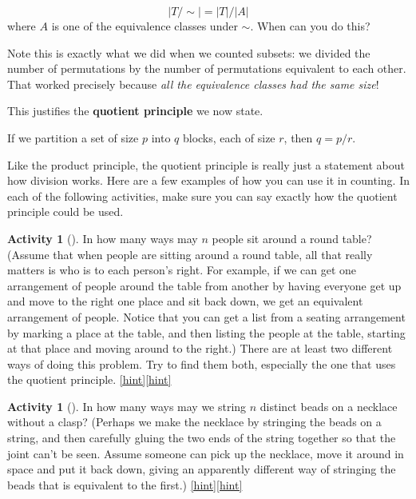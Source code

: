 \documentclass[10pt,]{book}
\newcommand{\terminology}[1]{\textbf{#1}}
\theoremstyle{plain}
\theoremstyle{definition}
\theoremstyle{definition}
\theoremstyle{definition}
\newtheorem{activity}[project]{Activity}
\numberwithin{equation}{chapter}
\begin{document}
\begin{equation*}
|T/\sim| = |T|/|A|
\end{equation*}
where \(A\) is one of the equivalence classes under \(\sim\).  When can you do this?%
\par
\hypertarget{p-758}{}%
Note this is exactly what we did when we counted subsets: we divided the number of permutations by the number of permutations equivalent to each other.  That worked precisely because \emph{all the equivalence classes had the same size}!%
\par
\hypertarget{p-759}{}%
This justifies the \terminology{quotient principle} we now state.%
\begin{assemblage}\label{assemblage-quotientprinciple}
\hypertarget{p-760}{}%
If we partition a set of size \(p\) into \(q\) blocks, each of size \(r\), then \(q = p/r\).%
\end{assemblage}
\hypertarget{p-761}{}%
Like the product principle, the quotient principle is really just a statement about how division works.  Here are a few examples of how you can use it in counting.  In each of the following activities, make sure you can say exactly how the quotient principle could be used.%
\begin{activity}[]\label{roundtable}
\hypertarget{p-762}{}%
In how many ways may \(n\) people sit around a round table? (Assume that when people are sitting around a round table, all that really matters is who is to each person's right. For example, if we can get one arrangement of people around the table from another by having everyone get up and move to the right one place and sit back down, we get an equivalent arrangement of people. Notice that you can get a list from a seating arrangement by marking a place at the table, and then listing the people at the table, starting at that place and moving around to the right.) There are at least two different ways of doing this problem. Try to find them both, especially the one that uses the quotient principle.%
\hfill{\tiny\hyperlink{a-110}{[hint]}\hypertarget{q-110}{}}\hfill{\tiny\hyperlink{a-110}{[hint]}\hypertarget{q-110}{}}\end{activity}
\begin{activity}[]\label{necklace}
\hypertarget{p-766}{}%
In how many ways may we string \(n\) distinct beads on a necklace without a clasp? (Perhaps we make the necklace by stringing the beads on a string, and then carefully gluing the two ends of the string together so that the joint can't be seen. Assume someone can pick up the necklace, move it around in space and put it back down, giving an apparently different way of stringing the beads that is equivalent to the first.)%
\hfill{\tiny\hyperlink{a-111}{[hint]}\hypertarget{q-111}{}}\hfill{\tiny\hyperlink{a-111}{[hint]}\hypertarget{q-111}{}}\end{activity}
\end{document}
